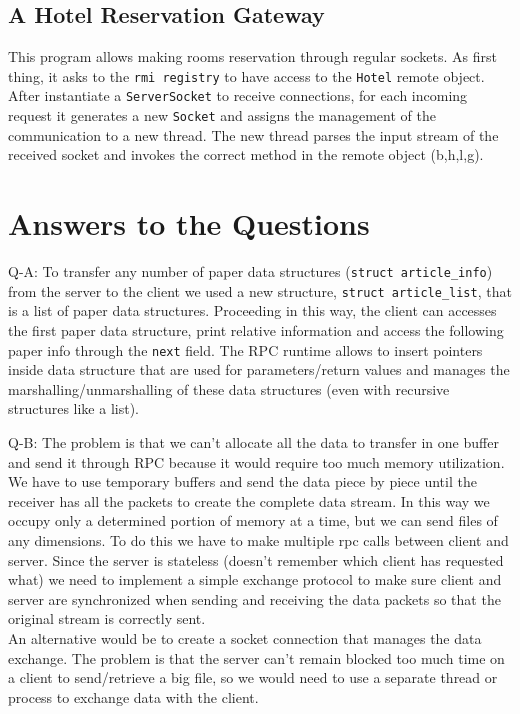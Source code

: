 \subsection{A Hotel Reservation Gateway}
This program allows making rooms reservation through regular sockets. As first thing, it asks to the \texttt{rmi registry} to have access to the \texttt{Hotel} remote object. After instantiate a  \texttt{ServerSocket} to receive connections, for each incoming request it generates a new \texttt{Socket} and assigns the management of the communication to a new thread. The new thread parses the input stream of the received socket and invokes the correct method in the remote object (b,h,l,g).

\section{Answers to the Questions}
Q-A: To transfer any number of paper data structures (\texttt{struct article\_info}) from the server to the client we used a new structure, \texttt{struct article\_list}, that is a list of paper data structures. Proceeding in this way, the client can accesses the first paper data structure, print relative information and access the following paper info through the \texttt{next} field. The RPC runtime allows to insert pointers inside data structure that are used for parameters/return values and manages the marshalling/unmarshalling of these data structures (even with recursive structures like a list). 

Q-B: The problem is that we can't allocate all the data to transfer in one buffer and send it through RPC because it would require too much memory utilization. We have to use temporary buffers and send the data piece by piece until the receiver has all the packets to create the complete data stream. In this way we occupy only a determined portion of memory at a time, but we can send files of any dimensions. To do this we have to make multiple rpc calls between client and server. Since the server is stateless (doesn't remember which client has requested what) we need to implement a simple exchange protocol to make sure client and server are synchronized when sending and receiving the data packets so that the original stream is correctly sent.\\
An alternative would be to create a socket connection that manages the data exchange. The problem is that the server can't remain blocked too much time on a client to send/retrieve a big file, so we would need to use a separate thread or process to exchange data with the client. 


